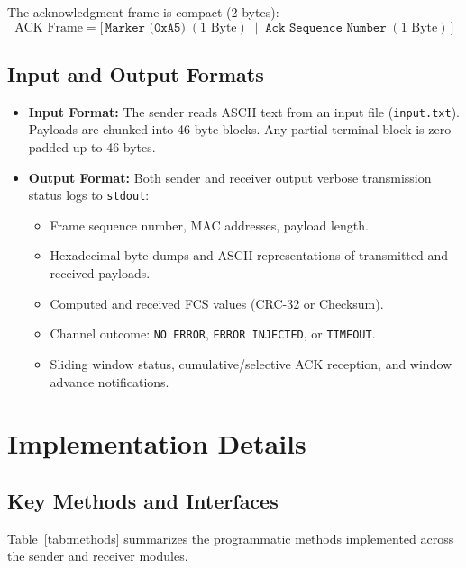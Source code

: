 \documentclass[11pt,a4paper]{article}
\begin{document}
The acknowledgment frame is compact (2 bytes):
\begin{equation}
    \text{ACK Frame} = \big[\, \texttt{Marker (0xA5)} \; (1\text{ Byte}) \;\mid\; \texttt{Ack Sequence Number} \; (1\text{ Byte}) \,\big]
\end{equation}

\subsection{Input and Output Formats}

\begin{itemize}
    \item \textbf{Input Format:} The sender reads ASCII text from an input file (\texttt{input.txt}). Payloads are chunked into 46-byte blocks. Any partial terminal block is zero-padded up to 46 bytes.
    \item \textbf{Output Format:} Both sender and receiver output verbose transmission status logs to \texttt{stdout}:
    \begin{itemize}
        \item Frame sequence number, MAC addresses, payload length.
        \item Hexadecimal byte dumps and ASCII representations of transmitted and received payloads.
        \item Computed and received FCS values (CRC-32 or Checksum).
        \item Channel outcome: \texttt{NO ERROR}, \texttt{ERROR INJECTED}, or \texttt{TIMEOUT}.
        \item Sliding window status, cumulative/selective ACK reception, and window advance notifications.
    \end{itemize}
\end{itemize}

\section{Implementation Details}

\subsection{Key Methods and Interfaces}

Table~\ref{tab:methods} summarizes the programmatic methods implemented across the sender and receiver modules.
\end{document}
